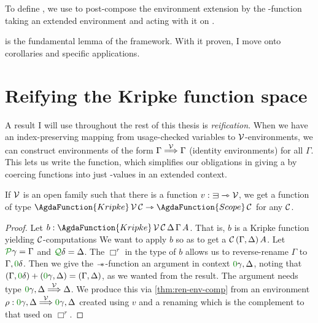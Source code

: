 
To define , we use  to
post-compose the environment extension by the
\AgdaSymbol{$\lambda$}-function taking an extended environment and
acting with it on .



 is the fundamental lemma of the framework.
With it proven, I move onto corollaries and specific applications.

\section{Reifying the Kripke function space}\label{sec:reify}

A result I will use throughout the rest of this thesis is \emph{reification}.
When we have an index-preserving mapping from usage-checked variables to
$\mathcal V$-environments, we can construct environments of the form
$\Gamma \stackrel{\mathcal V}\Longrightarrow \Gamma$ (identity environments) for all $\Gamma$.
This lets us write the  function, which  simplifies our
obligations in giving a  by coercing
 functions into just
\AgdaBound{$\C$}-values in an extended context.

\begin{lemma}\label{thm:reify}
  If $\mathcal V$ is an open family such that there is a function
  $v : {\sqni} \rightarrowtriangle \V$, we get a function of type
  $\AgdaFunction{Kripke}\,\V\,\C \rightarrowtriangle \AgdaFunction{Scope}\,\C$
  for any $\C$.
\end{lemma}
\begin{proof}
  Let $b : \AgdaFunction{Kripke}\,\V\,\C\,\Delta\,\Gamma\,A$.
  That is, $b$ is a Kripke function yielding $\C$-computations
  We want to apply $b$ so as to get a $\C\,\plr{\Gamma, \Delta}\,A$.
  Let $\grP\gamma = \Gamma$ and $\grQ\delta = \Delta$.
  The $\Box^r$ in the type of $b$ allows us to reverse-rename $\Gamma$ to
  $\Gamma, \gr0\delta$.
  Then we give the $\mathrel{\mathord{-}\hspace{-0.75ex}*}$-function an argument in context
  $\gr0\gamma, \Delta$, noting that
  $\plr{\Gamma, \gr0\delta} + \plr{\gr0\gamma, \Delta} = \plr{\Gamma, \Delta}$,
  as we wanted from the result.
  The argument needs type $\gr0\gamma, \Delta \env\V \Delta$.
  We produce this via \cref{thm:ren-env-comp} from an environment
  $\rho : \gr0\gamma, \Delta \env\V \gr0\gamma, \Delta$ created using $v$
  and a renaming which is the complement to that used on $\Box^r$.
\end{proof}

